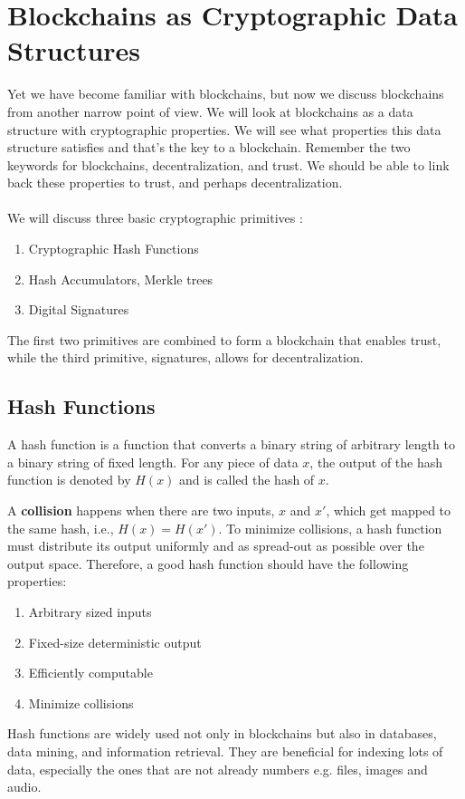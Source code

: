 \chapter{Blockchains as Cryptographic Data Structures}
Yet we have become familiar with blockchains, but now we discuss blockchains from another narrow point of view. We will look at blockchains as a data structure with cryptographic properties. We will see what properties this data structure satisfies and that's the key to a blockchain. Remember the two keywords for blockchains, decentralization, and trust. We should be able to link back these properties to trust, and perhaps decentralization.\\\\
We will discuss three basic cryptographic primitives :
\begin{enumerate}
    \item Cryptographic Hash Functions
    \item Hash Accumulators, Merkle trees
    \item Digital Signatures
\end{enumerate}
The first two primitives are combined to form a blockchain that enables trust, while the third primitive, signatures, allows for decentralization.\section{Hash Functions}
A hash function is a function that converts a binary string of arbitrary length to a binary string of fixed length. For any piece of data $x$, the output of the hash function is denoted by $H(x)$ and is called the hash of $x$. 

A \textbf{collision} happens when there are two inputs, $x$ and $x'$, which get mapped to the same hash, i.e., $H(x) = H(x')$.
To minimize collisions, a hash function must distribute its output uniformly and as spread-out as possible over the output space. Therefore, a good hash function should have the following properties:
\begin{enumerate}
    \item Arbitrary sized inputs
    \item Fixed-size deterministic output
    \item Efficiently computable
    \item Minimize collisions
\end{enumerate}
Hash functions are widely used not only in blockchains but also in databases, data mining, and information retrieval. They are beneficial for indexing lots of data, especially the ones that are not already numbers e.g. files, images and audio.
